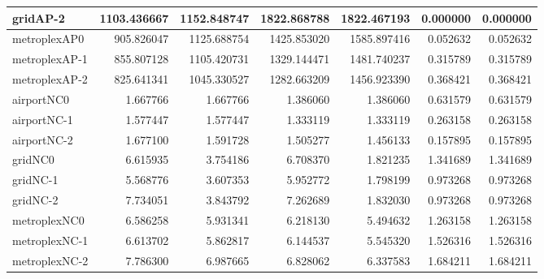\begin{longtable}{|l|r|r|r|r|r|r|}
gridAP-2 & 1103.436667 & 1152.848747 & 1822.868788 & 1822.467193 & 0.000000 & 0.000000 \\ \hline
metroplexAP0 & 905.826047 & 1125.688754 & 1425.853020 & 1585.897416 & 0.052632 & 0.052632 \\ \hline
metroplexAP-1 & 855.807128 & 1105.420731 & 1329.144471 & 1481.740237 & 0.315789 & 0.315789 \\ \hline
metroplexAP-2 & 825.641341 & 1045.330527 & 1282.663209 & 1456.923390 & 0.368421 & 0.368421 \\ \hline
airportNC0 & 1.667766 & 1.667766 & 1.386060 & 1.386060 & 0.631579 & 0.631579 \\ \hline
airportNC-1 & 1.577447 & 1.577447 & 1.333119 & 1.333119 & 0.263158 & 0.263158 \\ \hline
airportNC-2 & 1.677100 & 1.591728 & 1.505277 & 1.456133 & 0.157895 & 0.157895 \\ \hline
gridNC0 & 6.615935 & 3.754186 & 6.708370 & 1.821235 & 1.341689 & 1.341689 \\ \hline
gridNC-1 & 5.568776 & 3.607353 & 5.952772 & 1.798199 & 0.973268 & 0.973268 \\ \hline
gridNC-2 & 7.734051 & 3.843792 & 7.262689 & 1.832030 & 0.973268 & 0.973268 \\ \hline
metroplexNC0 & 6.586258 & 5.931341 & 6.218130 & 5.494632 & 1.263158 & 1.263158 \\ \hline
metroplexNC-1 & 6.613702 & 5.862817 & 6.144537 & 5.545320 & 1.526316 & 1.526316 \\ \hline
metroplexNC-2 & 7.786300 & 6.987665 & 6.828062 & 6.337583 & 1.684211 & 1.684211 \\ \hline
\end{longtable}
